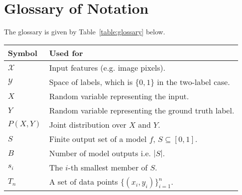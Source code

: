 \newpage
\section{Glossary of Notation}

The glossary is given by Table~\ref{table:glossary} below.

\begin{table*}[h]
\centering
\begin{tabular}{l l}
\toprule
Symbol & Used for \\
\midrule
$\mathcal{X}$ & Input features (e.g. image pixels). \\
$\mathcal{Y}$ & Space of labels, which is $\{0, 1\}$ in the two-label case. \\
$X$ & Random variable representing the input. \\
$Y$ & Random variable representing the ground truth label. \\
$P(X, Y)$ & Joint distribution over $X$ and $Y$. \\
$S$ & Finite output set of a model $f$, $S \subseteq [0, 1]$. \\
$B$ & Number of model outputs i.e. $|S|$. \\
$s_i$ & The $i$-th smallest member of $S$. \\
$T_n$ & A set of data points $\{(x_i, y_i)\}_{i=1}^n$. \\



\end{tabular}
\caption{
	Glossary of variables and symbols used in this paper.
}
\label{table:glossary}
\end{table*}
